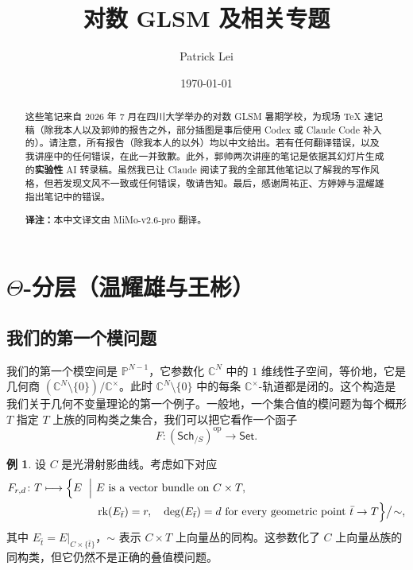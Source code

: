 \documentclass{amsart}
\title{对数 GLSM 及相关专题}
\author{Patrick Lei}
\date{\today}
\theoremstyle{definition}
\newtheorem{exm}[thm]{例}
\theoremstyle{remark}
\theoremstyle{plain}
\theoremstyle{definition}
\theoremstyle{remark}
\newcommand{\C}{\mathbb{C}}
\renewcommand{\P}{\mathbb{P}}
\newcommand{\mr}[1]{\mathrm{#1}}
\newcommand{\ms}[1]{\mathsf{#1}}
\newcommand{\1}{\mathbf{1}}
\newcommand{\2}{\mathbf{2}}
\newcommand{\3}{\mathbf{3}}
\begin{document}
\renewcommand{\abstractname}{摘要}
\renewcommand{\contentsname}{目录}
\renewcommand{\refname}{参考文献}
    
\begin{abstract}
    这些笔记来自 2026 年 7 月在四川大学举办的对数 GLSM 暑期学校，为现场 TeX 速记稿（除我本人以及郭帅的报告之外，部分插图是事后使用 Codex 或 Claude Code 补入的）。请注意，所有报告（除我本人的以外）均以中文给出。若有任何翻译错误，以及我讲座中的任何错误，在此一并致歉。此外，郭帅两次讲座的笔记是依据其幻灯片生成的\textbf{实验性} AI 转录稿。虽然我已让 Claude 阅读了我的全部其他笔记以了解我的写作风格，但若发现文风不一致或任何错误，敬请告知。最后，感谢周祐正、方婷婷与温耀雄指出笔记中的错误。

    \medskip
    \noindent\textbf{译注：}本中文译文由 MiMo-v2.6-pro 翻译。
\end{abstract}

\maketitle

\tableofcontents


\section{\(\Theta\)-分层（温耀雄与王彬）}%
\label{sec:Theta-stratifications}

\subsection{我们的第一个模问题}%
\label{sub:Our first moduli problem}

我们的第一个模空间是 \(\P^{N-1}\)，它参数化 \(\C^N\) 中的 \(1\) 维线性子空间，等价地，它是几何商 \((\C^N \setminus \{0\}) / \C^{\times}\)。此时 \(\C^N\setminus\{0\}\) 中的每条 \(\C^{\times}\)-轨道都是闭的。这个构造是我们关于几何不变量理论的第一个例子。一般地，一个集合值的模问题为每个概形 \(T\) 指定 \(T\) 上族的同构类之集合，我们可以把它看作一个函子
\[ F \colon (\ms{Sch}_{/S})^{\mr{op}} \to \ms{Set}. \]

\begin{exm}
    设 \(C\) 是光滑射影曲线。考虑如下对应
    \[
    \begin{aligned}
        F_{r,d}\colon T \longmapsto
        \Bigl\{
        E \ \Bigm|\ &
        E \text{ is a vector bundle on } C\times T,\\
        &\operatorname{rk}(E_{\bar t})=r,\quad \deg(E_{\bar t})=d
        \text{ for every geometric point } \bar t\to T
        \Bigr\}\big/\!\sim,
    \end{aligned}
    \]
    其中 \(E_{\bar t}=E|_{C\times\{\bar t\}}\)，\(\sim\) 表示 \(C\times T\) 上向量丛的同构。这参数化了 \(C\) 上向量丛族的同构类，但它仍然不是正确的叠值模问题。
\end{exm}
\end{document}
